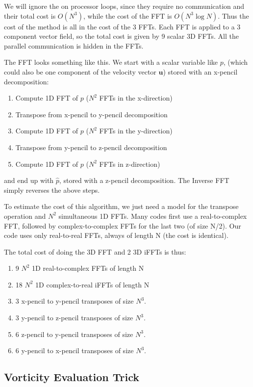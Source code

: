 \documentclass[12pt]{article}
\newcommand{\uv}{\mathbf u}
\begin{document}
We will ignore the on processor loops, since they require no
communication and their total cost is $O(N^3)$, while the cost of the
FFT is $O(N^3 \log N)$.   Thus the cost of the method is all in
the cost of the 3 FFTs.  Each FFT is applied to a 3 component
vector field, so the total cost is given by 9 scalar 3D FFTs.  
All the parallel communication is hidden in the FFTs. 

The FFT looks something like this.  We start with a scalar variable
like $p$, (which could also be one component of the velocity vector $\uv$)
stored with an x-pencil decomposition:
\begin{enumerate}
\item Compute 1D FFT of $p$ ($N^2$ FFTs in the x-direction)
\item Transpose from x-pencil to y-pencil decomposition
\item Compute 1D FFT of $p$ ($N^2$ FFTs in the y-direction)
\item Transpose from y-pencil to z-pencil decomposition
\item Compute 1D FFT of $p$ ($N^2$ FFTs in z-direction)
\end{enumerate}
and end up with $\hat p$, stored with a z-pencil decomposition.
The Inverse FFT simply reverses the above steps.  

To estimate the cost of this algorithm, we just need a model for the
transpose operation and $N^2$ simultaneous 1D FFTs.  
Many codes first use a real-to-complex FFT, followed by
complex-to-complex FFTs for the last two (of size N/2).  
Our code uses only real-to-real FFTs, always of length N (the cost
is identical).

The total cost of doing the 3D FFT and 2 3D iFFTs is thus:
\begin{enumerate}
\item 9 $N^2$ 1D real-to-complex FFTs of length N
\item 18 $N^2$ 1D complex-to-real iFFTs of length N
\item 3 x-pencil to y-pencil transposes of size $N^3$.  
\item 3 y-pencil to z-pencil transposes of size $N^3$.  
\item 6 z-pencil to y-pencil transposes of size $N^3$.  
\item 6 y-pencil to x-pencil transposes of size $N^3$.  
\end{enumerate}


\subsection{Vorticity Evaluation Trick}
\end{document}
